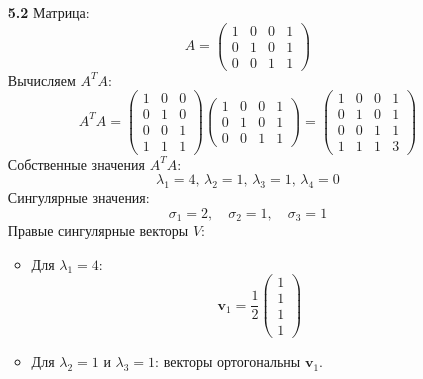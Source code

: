 \documentclass[a4paper]{article}
\begin{document}
\begin{enumerate}
\begin{enumerate}
  \item[\textbf{5.2}]
  Матрица:  
  \[
  A = \begin{pmatrix}
  1 & 0 & 0 & 1 \\
  0 & 1 & 0 & 1 \\
  0 & 0 & 1 & 1
  \end{pmatrix}
  \]
  Вычисляем \( A^T A \):  
  \[
  A^T A = \begin{pmatrix}
  1 & 0 & 0 \\
  0 & 1 & 0 \\
  0 & 0 & 1 \\
  1 & 1 & 1
  \end{pmatrix} \begin{pmatrix}
  1 & 0 & 0 & 1 \\
  0 & 1 & 0 & 1 \\
  0 & 0 & 1 & 1
  \end{pmatrix} = \begin{pmatrix}
  1 & 0 & 0 & 1 \\
  0 & 1 & 0 & 1 \\
  0 & 0 & 1 & 1 \\
  1 & 1 & 1 & 3
  \end{pmatrix}
  \]
  Собственные значения \( A^T A \):  
  \[
  \lambda_1 = 4, \, \lambda_2 = 1, \, \lambda_3 = 1, \, \lambda_4 = 0
  \]  
  Сингулярные значения:  
  \[
  \sigma_1 = 2, \quad \sigma_2 = 1, \quad \sigma_3 = 1
  \]
  Правые сингулярные векторы \( V \):  
  \begin{itemize}
    \item 
    Для \( \lambda_1 = 4 \):  
    \[
    \mathbf{v}_1 = \frac{1}{2} \begin{pmatrix} 1 \\ 1 \\ 1 \\ 1 \end{pmatrix}
    \]  

    \item
    Для \( \lambda_2 = 1 \) и \( \lambda_3 = 1 \): векторы ортогональны 
    \( \mathbf{v}_1 \).
  \end{itemize}


\end{enumerate}
\end{enumerate}
\end{document}
